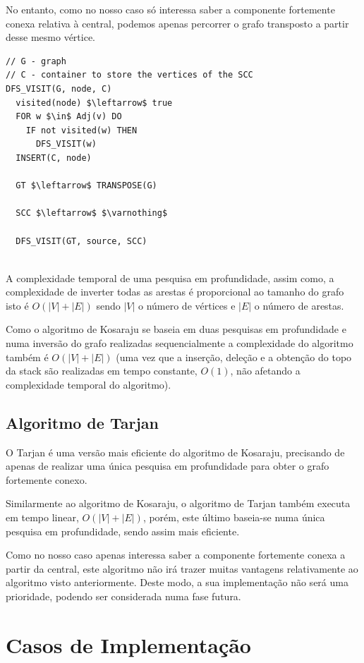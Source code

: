 \documentclass[article, a4paper, 12pt, oneside]{memoir}
\begin{document}
No entanto, como no nosso caso só interessa saber a componente fortemente conexa relativa à central, podemos apenas percorrer o grafo transposto a partir desse mesmo vértice. \\


\begin{lstlisting}[frame=single, mathescape=true]
// G - graph
// C - container to store the vertices of the SCC
DFS_VISIT(G, node, C)
  visited(node) $\leftarrow$ true
  FOR w $\in$ Adj(v) DO
    IF not visited(w) THEN
      DFS_VISIT(w)
  INSERT(C, node)

  GT $\leftarrow$ TRANSPOSE(G)
  
  SCC $\leftarrow$ $\varnothing$ 
  
  DFS_VISIT(GT, source, SCC)
  
\end{lstlisting}

A complexidade temporal de uma pesquisa em profundidade, assim como, a complexidade de inverter todas as arestas é proporcional ao tamanho do grafo isto é $O(|V| + |E|)$ sendo $|V|$ o número de vértices e $|E|$ o número de arestas.

Como o algoritmo de Kosaraju se baseia em duas pesquisas em profundidade e numa inversão do grafo realizadas sequencialmente a complexidade do algoritmo também é $O(|V| + |E|)$ (uma vez que a inserção, deleção e a obtenção do topo da stack são realizadas em tempo constante, $O(1)$, não afetando a complexidade temporal do algoritmo).

\subsection{Algoritmo de Tarjan}

O Tarjan é uma versão mais eficiente do algoritmo de Kosaraju, precisando de apenas de realizar uma única pesquisa em profundidade para obter o grafo fortemente conexo. 

Similarmente ao algoritmo de Kosaraju, o algoritmo de Tarjan também executa em tempo linear, $O(|V| + |E|)$, porém, este último baseia-se numa única pesquisa em profundidade, sendo assim mais eficiente.

Como no nosso caso apenas interessa saber a componente fortemente conexa a partir da central, este algoritmo não irá trazer muitas vantagens relativamente ao algoritmo visto anteriormente. Deste modo, a sua implementação não será uma prioridade, podendo ser considerada numa fase futura.


\section{Casos de Implementação}
\end{document}
